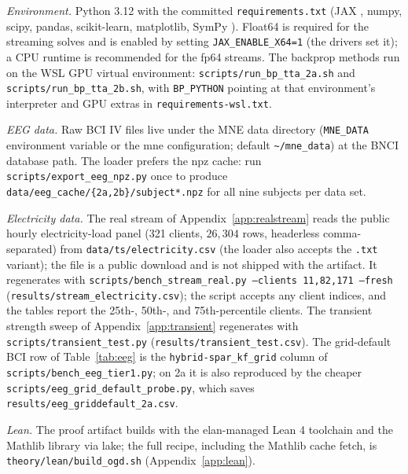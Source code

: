 \documentclass[11pt]{article}
\begin{document}
\emph{Environment.}
Python 3.12 with the committed \texttt{requirements.txt} (JAX \citep{bradbury2018jax}, numpy, scipy, pandas, scikit-learn, matplotlib, SymPy \citep{meurer2017sympy}).
Float64 is required for the streaming solves and is enabled by setting \texttt{JAX\_ENABLE\_X64=1} (the drivers set it); a CPU runtime is recommended for the fp64 streams.
The backprop methods run on the WSL GPU virtual environment: \texttt{scripts/run\_bp\_tta\_2a.sh} and \texttt{scripts/run\_bp\_tta\_2b.sh}, with \texttt{BP\_PYTHON} pointing at that environment's interpreter and GPU extras in \texttt{requirements-wsl.txt}.

\emph{EEG data.}
Raw BCI IV files live under the MNE data directory (\texttt{MNE\_DATA} environment variable or the mne configuration; default \texttt{\~{}/mne\_data}) at the BNCI database path.
The loader prefers the npz cache: run \texttt{scripts/export\_eeg\_npz.py} once to produce \texttt{data/eeg\_cache/\{2a,2b\}/subject*.npz} for all nine subjects per data set.

\emph{Electricity data.}
The real stream of Appendix~\ref{app:realstream} reads the public hourly electricity-load panel (321 clients, $26{,}304$ rows, headerless comma-separated) from \texttt{data/ts/electricity.csv} (the loader also accepts the \texttt{.txt} variant); the file is a public download and is not shipped with the artifact.
It regenerates with \texttt{scripts/bench\_stream\_real.py --clients 11,82,171 --fresh} (\texttt{results/stream\_electricity.csv}); the script accepts any client indices, and the tables report the 25th-, 50th-, and 75th-percentile clients.
The transient strength sweep of Appendix~\ref{app:transient} regenerates with \texttt{scripts/transient\_test.py} (\texttt{results/transient\_test.csv}).
The grid-default BCI row of Table~\ref{tab:eeg} is the \texttt{hybrid-spar\_kf\_grid} column of \texttt{scripts/bench\_eeg\_tier1.py}; on 2a it is also reproduced by the cheaper \texttt{scripts/eeg\_grid\_default\_probe.py}, which saves \texttt{results/eeg\_griddefault\_2a.csv}.

\emph{Lean.}
The proof artifact builds with the elan-managed Lean 4 \citep{demoura2021} toolchain and the Mathlib library \citep{mathlib2020} via lake; the full recipe, including the Mathlib cache fetch, is \texttt{theory/lean/build\_ogd.sh} (Appendix~\ref{app:lean}).
\end{document}
